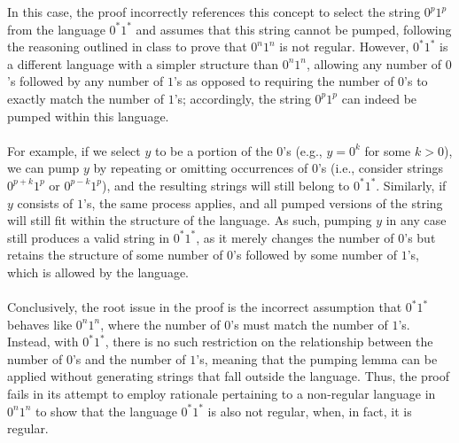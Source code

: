 \documentclass[12pt]{article}
\begin{document}
{In this case, the proof incorrectly references this concept to select the string $0^p1^p$ from the language $0^*1^*$ and assumes that this string cannot be pumped, following the reasoning outlined in class to prove that $0^n1^n$ is not regular. However, $0^*1^*$ is a different language with a simpler structure than $0^n1^n$, allowing any number of $0$'s followed by any number of $1$'s as opposed to requiring the number of $0$'s to exactly match the number of $1$'s; accordingly, the string $0^p1^p$ can indeed be pumped within this language.\\
\\
For example, if we select $y$ to be a portion of the $0$'s (e.g., $y = 0^k$ for some $k > 0$), we can pump $y$ by repeating or omitting occurrences of $0$'s (i.e., consider strings $0^{p+k}1^p$ or $0^{p-k}1^p$), and the resulting strings will still belong to $0^*1^*$. Similarly, if $y$ consists of $1$'s, the same process applies, and all pumped versions of the string will still fit within the structure of the language. As such, pumping $y$ in any case still produces a valid string in $0^*1^*$, as it merely changes the number of $0$'s but retains the structure of some number of $0$'s followed by some number of $1$'s, which is allowed by the language.\\
\\
Conclusively, the root issue in the proof is the incorrect assumption that $0^*1^*$ behaves like $0^n1^n$, where the number of $0$'s must match the number of $1$'s. Instead, with $0^*1^*$, there is no such restriction on the relationship between the number of $0$'s and the number of $1$'s, meaning that the pumping lemma can be applied without generating strings that fall outside the language. Thus, the proof fails in its attempt to employ rationale pertaining to a non-regular language in $0^n1^n$ to show that the language $0^*1^*$ is also not regular, when, in fact, it is regular.
}

\vspace{12pt}
\end{document}
